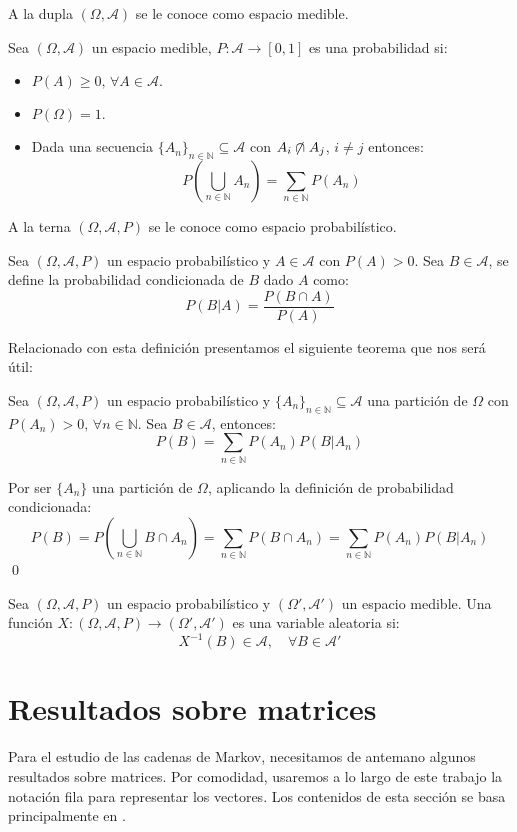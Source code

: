 A la dupla $(\Omega,\mathcal{A})$ se le conoce como espacio medible.
\begin{definition}
    Sea $(\Omega,\mathcal{A})$ un espacio medible, $P:\mathcal{A}\longrightarrow [0,1]$ es una probabilidad si:
    \begin{itemize}
        \item $P(A)\geq 0, \, \forall A\in\mathcal{A}.$
        \item $P(\Omega)=1.$
        \item Dada una secuencia $\{A_{n}\}_{n\in\mathbb{N}}\subseteq\mathcal{A}$ con $A_i\centernot\cap A_j$, $i\neq j$ entonces:
        \[P\left(\bigcup_{n\in\mathbb{N}}A_n\right)=\sum_{n\in\mathbb{N}}P(A_n)\]
    \end{itemize}
\end{definition}
A la terna $(\Omega,\mathcal{A},P)$ se le conoce como espacio probabilístico.
\begin{definition}
    Sea $(\Omega,\mathcal{A},P)$ un espacio probabilístico y $A\in\mathcal{A}$ con $P(A)>0$. Sea $B\in\mathcal{A}$, se define la probabilidad condicionada de $B$ dado $A$ como:
    \[P(B|A)=\dfrac{P(B\cap A)}{P(A)}\]
\end{definition}
Relacionado con esta definición presentamos el siguiente teorema que nos será útil:
\begin{theorem}
    Sea $(\Omega,\mathcal{A},P)$ un espacio probabilístico y $\{A_{n}\}_{n\in\mathbb{N}}\subseteq\mathcal{A}$ una partición de $\Omega$ con $P(A_n)>0, \,\forall n \in \mathbb{N}$. Sea $B\in\mathcal{A}$, entonces:
    \[P(B)=\sum_{n\in\mathbb{N}}P(A_n)P(B|A_n)\]
\end{theorem}
\begin{proofs*}
    Por ser $\{A_n\}$ una partición de $\Omega$, aplicando la definición de probabilidad condicionada:
    \[P(B)=P\left(\bigcup_{n\in\mathbb{N}}B\cap A_n\right)=\sum_{n\in\mathbb{N}}P(B\cap A_n)
        =\sum_{n\in\mathbb{N}}P(A_n)P(B|A_n)\]\qed
\end{proofs*}

\begin{definition}
 Sea $(\Omega,\mathcal{A},P)$ un espacio probabilístico y $(\Omega',\mathcal{A}')$ un espacio medible. Una función $X:(\Omega,\mathcal{A},P)\longrightarrow(\Omega',\mathcal{A}')$ es una variable aleatoria si:
 \[X^{-1}(B)\in\mathcal{A}, \quad \forall B\in\mathcal{A}'\]
\end{definition}

\section{Resultados sobre matrices}
Para el estudio de las cadenas de Markov, necesitamos de antemano algunos resultados sobre matrices. Por comodidad, usaremos a lo largo de este trabajo la notación fila para representar los vectores. Los contenidos de esta sección se basa principalmente en \cite{Salinelli}.

